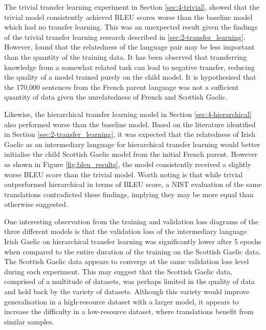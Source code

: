 The trivial transfer learning experiment in Section \ref{sec:4-trivial}, showed that the trivial model consistently achieved \acrshort{BLEU} scores worse than the baseline model which had no transfer learning. This was an unexpected result given the findings of the trivial transfer learning research described in \ref{sec:2-transfer_learning}.  
However, \cite{wang_negative_transfer_2019} found that the relatedness of the language pair may be less important than the quantity of the training data. It has been observed that transferring knowledge from a somewhat related task can lead to negative transfer, reducing the quality of a model trained purely on the child model. It is hypothesised that the 170,000 sentences from the French parent language was not a sufficient quantity of data given the unrelatedness of French and Scottish Gaelic.

Likewise, the hierarchical transfer learning model in Section \ref{sec:4-hierarchical} also performed worse than the baseline model. Based on the literature identified in Section \ref{sec:2-transfer_learning}, it was expected that the relatedness of Irish Gaelic as an intermediary language for hierarchical transfer learning would better initialise the child Scottish Gaelic model from the initial French parent. However as shown in Figure \ref{fig:bleu_results}, the model consistently received a slightly worse \acrshort{BLEU} score than the trivial model. Worth noting is that while trivial outperformed hierarchical in terms of \acrshort{BLEU} score, a \acrshort{NIST} evaluation of the same translations contradicted these findings, implying they may be more equal than otherwise suggested.

One interesting observation from the training and validation loss diagrams of the three different models is that the validation loss of the intermediary language Irish Gaelic on hierarchical transfer learning was significantly lower after 5 epochs when compared to the entire duration of the training on the Scottish Gaelic data. The Scottish Gaelic data appears to converge at the same validation loss level during each experiment. This may suggest that the Scottish Gaelic data, comprised of a multitude of datasets, was perhaps limited in the quality of data and held back by the variety of datasets. Although this variety would improve generalisation in a high-resource dataset with a larger model, it appears to increase the difficulty in a low-resource dataset, where translations benefit from similar samples.

